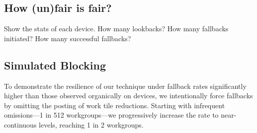 \documentclass[sigconf]{acmart}
\begin{document}
\subsection{How (un)fair is fair?}
Show the stats of each device. How many lookbacks?  How many fallbacks initiated? How many successful fallbacks?

\subsection{Simulated Blocking}
To demonstrate the resilience of our technique under fallback rates significantly higher than those observed organically on devices, we intentionally force fallbacks by omitting the posting of work tile reductions. Starting with infrequent omissions---1 in 512 workgroups---we progressively increase the rate to near-continuous levels, reaching 1 in 2 workgroups.
\end{document}
